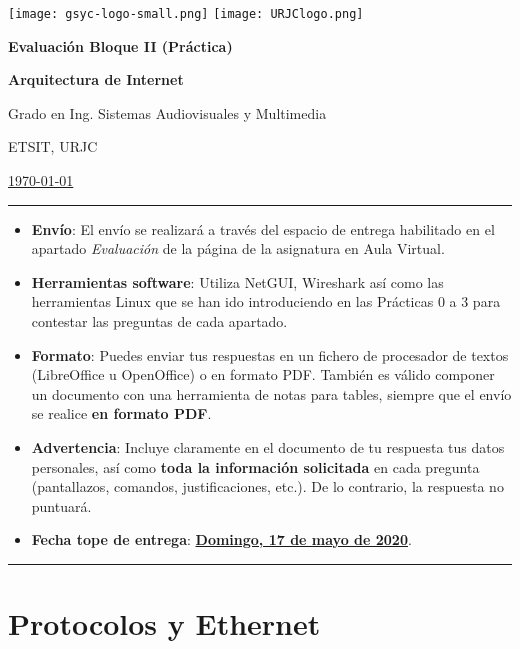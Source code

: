 \documentclass[a4paper]{article}
\newcommand{\usageitem}[1]{%
  \item[%
    {\makebox[2em]{\strut #1}}%
  ]
}
\begin{document}
	
\texttt{[image: gsyc-logo-small.png]} \hspace{8cm} \texttt{[image: URJClogo.png]}

\begin{center}
 \LARGE{\textbf{Evaluación Bloque II (Práctica)}}
 \smallskip
 
 \large{\textbf{Arquitectura de Internet}}
 
 \large{Grado en Ing. Sistemas Audiovisuales y Multimedia}
 
 \large{ETSIT, URJC}
 \smallskip
 
 \large{\underline{\today}}
\end{center}
\bigskip

\hrule
\medskip


\begin{itemize}[leftmargin=0.8cm,itemsep=6pt,topsep=6pt]
  \usageitem{\faSend} \textbf{Envío}: El envío se realizará a través del espacio de entrega
  habilitado en el apartado \textit{Evaluación} de la página de la asignatura en Aula Virtual.
	
  \usageitem{\faWrench} \textbf{Herramientas software}: Utiliza NetGUI, Wireshark así como las herramientas
  Linux que se han ido introduciendo en las Prácticas 0 a 3 para contestar las preguntas de
  cada apartado. 
  
  \usageitem{\faFileO} \textbf{Formato}: Puedes enviar tus respuestas en un fichero de procesador de textos (LibreOffice
  u OpenOffice) o en formato PDF. También es válido componer un documento con una herramienta
  de notas para tables, siempre que el envío se realice \textbf{en formato PDF}.
  
  \usageitem{\faExclamationCircle} \textbf{Advertencia}: Incluye claramente en el documento
  de tu respuesta tus datos personales, así como \textbf{toda la información solicitada} en
  cada pregunta (pantallazos, comandos, justificaciones, etc.). De lo contrario, la respuesta
  no puntuará.
  
  \usageitem{\faCalendar} \textbf{Fecha tope de entrega}: \textbf{\underline{Domingo, 17 de mayo de 2020}}.
\end{itemize}

\medskip
\hrule

\bigskip

\section{Protocolos y Ethernet}
\label{sec:protocolos-eth}
\end{document}

